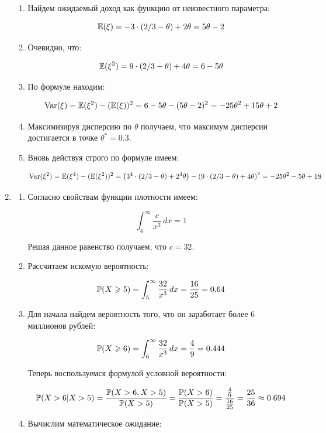 \begin{enumerate}
\begin{enumerate}
		\item Найдем ожидаемый доход как функцию от неизвестного параметра:
		
		\[
		\E(\xi)=-3\cdot (2/3-\theta)+2\theta=5\theta-2
		\]
		
		\item Очевидно, что:
		
		\[
		\E(\xi^2)=9\cdot (2/3-\theta)+4\theta=6-5\theta
		\]
		
		\item По формуле находим:
		
		\[
		\Var(\xi)=\E(\xi^2)-(\E(\xi))^2=6-5\theta-(5\theta-2)^2=-25\theta^2+15\theta+2
		\]
		
		\item Максимизируя дисперсию по $\theta$ получаем, что максимум дисперсии достигается в точке $\theta^*=0.3$.
		
		\item Вновь действуя строго по формуле имеем:
		
		\[
		\Var(\xi^2)=\E(\xi^4)-(\E(\xi^2))^2=\left(3^{4}\cdot (2/3-\theta)+2^{4}\theta\right)-\left(9\cdot (2/3-\theta)+4\theta\right)^2=-25\theta^2-5\theta+18
		\]
		
	\end{enumerate}
	
	\item 
	\begin{enumerate}
		\item Согласно свойствам функции плотности имеем:
		
		\[
		\int_{4}^{\infty} \frac{c}{x^3}\, dx=1
		\]
		
		Решая данное равенство получаем, что $c=32$.
		
		\item Рассчитаем искомую вероятность:
		
		\[
		\P(X\geq5)=\int_{5}^{\infty} \frac{32}{x^3} \, dx=\frac{16}{25}=0.64
		\]
		
		\item Для начала найдем вероятность того, что он заработает более $6$ миллионов рублей:
		
		\[
		\P(X\geq6)=\int_{6}^{\infty} \frac{32}{x^3} \, dx=\frac{4}{9}=0.444
		\]
		
		Теперь воспользуемся формулой условной вероятности:
	
	\[
	\P(X>6|X>5)=\frac{\P(X>6, X>5)}{\P(X>5)}=\frac{\P(X>6)}{\P(X>5)}=\frac{\frac{4}{9}}{\frac{16}{25}}=\frac{25}{36}\approx0.694
	\]
	
	\item Вычислим математическое ожидание:
	

\end{enumerate}
\end{enumerate}
